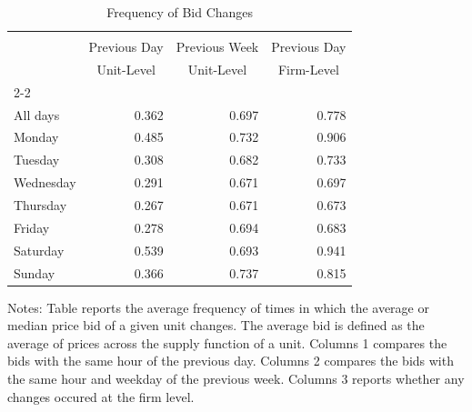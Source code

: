 \begin{table}
\centering
\caption{Frequency of Bid Changes}\label{tab:frequency}
\begin{tabular*}{0.8\textwidth}{@{\extracolsep{\fill}} lrrr}
 \hline\hline \\[-\sep] 
 & \multicolumn{1}{c}{{Previous Day}}  & \multicolumn{1}{c}{{Previous Week}}  & \multicolumn{1}{c}{{Previous Day}} \\ 
 & \multicolumn{1}{c}{{Unit-Level}}  & \multicolumn{1}{c}{{Unit-Level}}  & \multicolumn{1}{c}{{Firm-Level}} 
\\ \cline{2-2} \cline{3-3} \cline{4-4} \\[-\sep] 
All days  & 0.362 & 0.697 & 0.778  \\[\sep] 
 Monday  & 0.485 & 0.732 & 0.906\\
 Tuesday  & 0.308 & 0.682 & 0.733\\
 Wednesday  & 0.291 & 0.671 & 0.697\\
 Thursday  & 0.267 & 0.671 & 0.673\\
 Friday  & 0.278 & 0.694 & 0.683\\
 Saturday  & 0.539 & 0.693 & 0.941\\
 Sunday  & 0.366 & 0.737 & 0.815\\ \hline\hline 
\end{tabular*}
\begin{minipage}[c]{0.8\textwidth}
{\footnotesize 
\noindent
Notes: Table reports the average frequency of times in which the average or median price bid of a given 
unit changes. The average bid is defined as the average of prices across the supply function 
of a unit. Columns 1 compares the bids with the same hour of the previous day. 
Columns 2 compares the bids with the same hour and weekday of the previous week. 
Columns 3 reports whether any changes occured at the firm level. 
}
\end{minipage}
\end{table}
